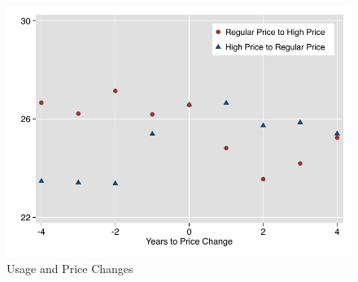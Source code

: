\documentclass[12pt,table]{article}
\begin{document}
\begin{figure}
\begin{center}
\caption{Usage and Price Changes}\label{figure:usagepricechanges}
\includegraphics[scale=1]{tables/r_to_s_graph.pdf}
\end{center}
\end{figure}













\end{document}
